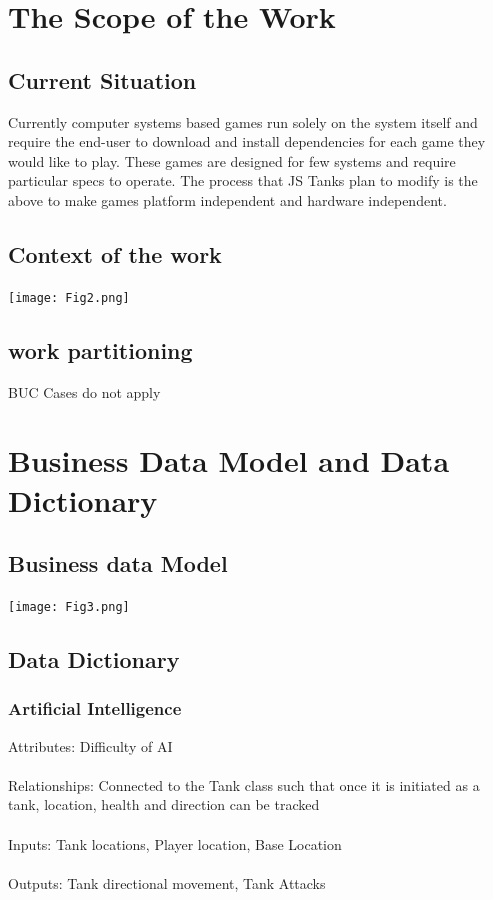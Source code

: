 \documentclass{article}
\begin{document}
\section{The Scope of the Work} 
 \subsection{Current Situation}
 Currently
computer systems based games run solely on the system itself and  require the
end-user to download and install dependencies for each game they would like to
play. These games are designed for few systems and require particular specs to
operate. The process that JS Tanks plan to modify is the above to make games
platform independent and hardware independent.

\subsection{Context of the work}
\texttt{[image: Fig2.png]}
\subsection{work partitioning}
BUC Cases do not apply
\section{Business Data Model and Data Dictionary}
\subsection{Business data Model}
\texttt{[image: Fig3.png]}
\subsection{Data Dictionary}
\subsubsection{Artificial Intelligence}
Attributes: Difficulty of AI
\\\\Relationships:  Connected to the Tank class such that once it is initiated 
as a tank, location, health and direction can be tracked
\\\\Inputs: Tank locations, Player location, Base Location
\\\\Outputs: Tank directional movement, Tank Attacks
\end{document}
